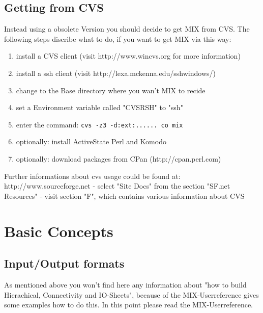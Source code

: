 \documentclass[a4paper,12pt]{article}
\begin{document}
\subsection{Getting from CVS}
Instead using a obsolete Version you should decide to get MIX from CVS. The following steps discribe what to do, if you want to get MIX via this way:
\begin{enumerate}
\item{install a CVS client (visit http://www.wincvs.org for more information)}
\item{install a ssh client (visit http://lexa.mckenna.edu/sshwindows/)}
\item{change to the Base directory where you wan't MIX to recide}
\item{set a Environment variable called "CVSRSH" to "ssh"}
\item{enter the command: \tt{cvs -z3 -d:ext:...... co mix}}
\item{optionally: install ActiveState Perl and Komodo}
\item{optionally: download packages from CPan (http://cpan.perl.com)}
\end{enumerate}
Further informations about cvs usage could be found at: http://www.sourceforge.net\newline
\hspace*{10mm}- select "Site Docs" from the section "SF.net Resources"\newline
\hspace*{10mm}- visit section "F", which contains various information about CVS

\section{Basic Concepts}
\subsection{Input/Output formats}
As mentioned above you won't find here any information about "how to build Hierachical, Connectivity and IO-Sheets", because of the MIX-Userreference gives some examples how to do this. In this point please read the MIX-Userreference.
\end{document}

